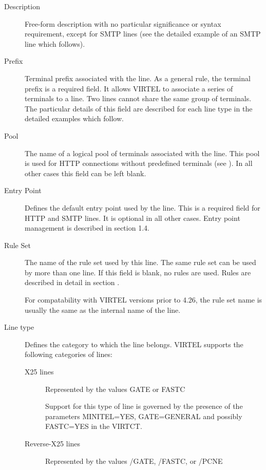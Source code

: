 \documentclass[letterpaper,10pt,english]{sphinxmanual}
\begin{document}
\begin{description}
\begin{description}
\end{description}

\item[{Description}] \leavevmode
Free-form description with no particular significance or syntax
requirement, except for SMTP lines (see the detailed example of an
SMTP line which follows).

\item[{Prefix}] \leavevmode
Terminal prefix associated with the line. As a general rule, the
terminal prefix is a required field. It allows VIRTEL to associate a
series of terminals to a line. Two lines cannot share the same group
of terminals. The particular details of this field are described for
each line type in the detailed examples which follow.

\item[{Pool}] \leavevmode
The name of a logical pool of terminals associated with the line.
This pool is used for HTTP connections without predefined terminals
(see {\hyperref[\detokenize{connectivity_guide:v457cn-forceluname}]{}}). In all other cases this field can be left
blank.

\item[{Entry Point}] \leavevmode
Defines the default entry point used by the line. This is a required
field for HTTP and SMTP lines. It is optional in all other cases.
Entry point management is described in section 1.4.

\item[{Rule Set}] \leavevmode
The name of the rule set used by this line. The same rule set can be
used by more than one line. If this field is blank, no rules are
used. Rules are described in detail in section .

For compatability with VIRTEL versions prior to 4.26, the rule set
name is usually the same as the internal name of the line.

\item[{Line type}] \leavevmode
Defines the category to which the line belongs. VIRTEL supports the
following categories of lines:
\begin{description}
\item[{X25 lines}] \leavevmode
Represented by the values GATE or FASTC

Support for this type of line is governed by the presence of the
parameters MINITEL=YES, GATE=GENERAL and possibly FASTC=YES in the
VIRTCT.

\item[{Reverse-X25 lines}] \leavevmode
Represented by the values /GATE, /FASTC, or /PCNE


\end{description}
\end{description}
\end{document}
